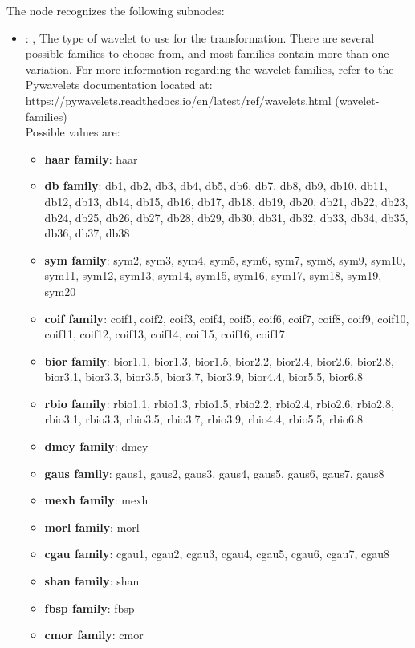 \begin{itemize}
      The  node recognizes the following subnodes:
      \begin{itemize}
        \item {}: ,
          The type of wavelet to use for the transformation.     There are several possible families
          to choose from, and most families contain     more than one variation. For more
          information regarding the wavelet families,     refer to the Pywavelets documentation
          located at:     https://pywavelets.readthedocs.io/en/latest/ref/wavelets.html (wavelet-
          families)     \\     Possible values are:     \begin{itemize}       \item \textbf{haar
          family}: haar       \item \textbf{db family}: db1, db2, db3, db4, db5, db6, db7, db8, db9,
          db10, db11,         db12, db13, db14, db15, db16, db17, db18, db19, db20, db21, db22,
          db23,         db24, db25, db26, db27, db28, db29, db30, db31, db32, db33, db34, db35,
          db36, db37, db38       \item \textbf{sym family}: sym2, sym3, sym4, sym5, sym6, sym7,
          sym8, sym9, sym10,         sym11, sym12, sym13, sym14, sym15, sym16, sym17, sym18, sym19,
          sym20       \item \textbf{coif family}: coif1, coif2, coif3, coif4, coif5, coif6, coif7,
          coif8,         coif9, coif10, coif11, coif12, coif13, coif14, coif15, coif16, coif17
          \item \textbf{bior family}: bior1.1, bior1.3, bior1.5, bior2.2, bior2.4, bior2.6,
          bior2.8, bior3.1, bior3.3, bior3.5, bior3.7, bior3.9, bior4.4, bior5.5,         bior6.8
          \item \textbf{rbio family}: rbio1.1, rbio1.3, rbio1.5, rbio2.2, rbio2.4, rbio2.6,
          rbio2.8, rbio3.1, rbio3.3, rbio3.5, rbio3.7, rbio3.9, rbio4.4, rbio5.5,         rbio6.8
          \item \textbf{dmey family}: dmey       \item \textbf{gaus family}: gaus1, gaus2, gaus3,
          gaus4, gaus5, gaus6, gaus7, gaus8       \item \textbf{mexh family}: mexh       \item
          \textbf{morl family}: morl       \item \textbf{cgau family}: cgau1, cgau2, cgau3, cgau4,
          cgau5, cgau6, cgau7, cgau8       \item \textbf{shan family}: shan       \item \textbf{fbsp
          family}: fbsp       \item \textbf{cmor family}: cmor     \end{itemize}
      \end{itemize}


\end{itemize}
